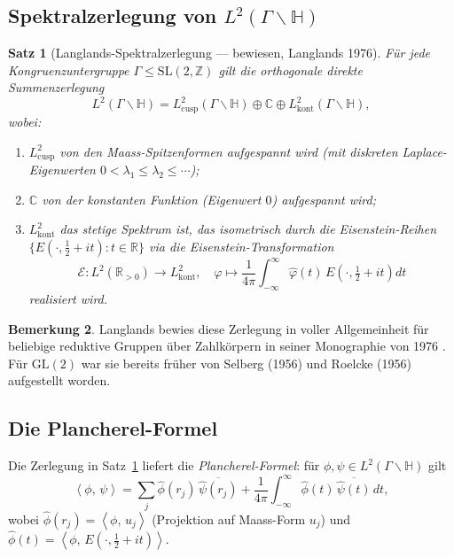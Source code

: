 \documentclass[12pt,a4paper]{amsart}
\newtheorem{theorem}{Satz}[section]
\theoremstyle{definition}
\newtheorem{bemerkung}[theorem]{Bemerkung}
\newcommand{\HH}{\mathbb{H}}
\newcommand{\ZZ}{\mathbb{Z}}
\newcommand{\RR}{\mathbb{R}}
\newcommand{\CC}{\mathbb{C}}
\newcommand{\GL}{\mathrm{GL}}
\newcommand{\SL}{\mathrm{SL}}
\newcommand{\inner}[2]{\left\langle #1,\, #2 \right\rangle}
\begin{document}
\subsection{Spektralzerlegung von \texorpdfstring{$L^2(\Gamma \backslash \HH)$}{L2}}

\begin{theorem}[Langlands-Spektralzerlegung — bewiesen, Langlands 1976]
\label{satz:langlands_zerlegung}
Für jede Kongruenzuntergruppe $\Gamma \leq \SL(2,\ZZ)$ gilt die orthogonale
direkte Summenzerlegung
\[
L^2(\Gamma \backslash \HH) = L^2_{\mathrm{cusp}}(\Gamma \backslash \HH) \oplus \CC \oplus L^2_{\mathrm{kont}}(\Gamma \backslash \HH),
\]
wobei:
\begin{enumerate}[label=(\roman*)]
\item $L^2_{\mathrm{cusp}}$ von den \emph{Maass-Spitzenformen} aufgespannt wird
  (mit diskreten Laplace-Eigenwerten $0 < \lambda_1 \leq \lambda_2 \leq \cdots$);
\item $\CC$ von der konstanten Funktion (Eigenwert $0$) aufgespannt wird;
\item $L^2_{\mathrm{kont}}$ das stetige Spektrum ist, das isometrisch durch die
  Eisenstein-Reihen $\bigl\{E(\cdot,\tfrac{1}{2}+it) : t \in \RR\bigr\}$ via
  die Eisenstein-Transformation
  \[
  \mathcal{E}: L^2(\RR_{>0}) \to L^2_{\mathrm{kont}},\quad
  \varphi \mapsto \frac{1}{4\pi}\int_{-\infty}^\infty \hat\varphi(t)\, E\!\left(\cdot, \tfrac{1}{2}+it\right) dt
  \]
  realisiert wird.
\end{enumerate}
\end{theorem}

\begin{bemerkung}
Langlands bewies diese Zerlegung in voller Allgemeinheit für beliebige reduktive
Gruppen über Zahlkörpern in seiner Monographie von 1976 \cite{langlands1976}.
Für $\GL(2)$ war sie bereits früher von Selberg (1956) und Roelcke (1956) aufgestellt
worden.
\end{bemerkung}

\subsection{Die Plancherel-Formel}

Die Zerlegung in Satz~\ref{satz:langlands_zerlegung} liefert die \emph{Plancherel-Formel}:
für $\phi, \psi \in L^2(\Gamma \backslash \HH)$ gilt
\[
\inner{\phi}{\psi} = \sum_j \hat\phi(r_j)\, \overline{\hat\psi(r_j)}
+ \frac{1}{4\pi} \int_{-\infty}^\infty \hat\phi(t)\, \overline{\hat\psi(t)}\, dt,
\]
wobei $\hat\phi(r_j) = \inner{\phi}{u_j}$ (Projektion auf Maass-Form $u_j$) und
$\hat\phi(t) = \inner{\phi}{E(\cdot, \frac{1}{2}+it)}$.
\end{document}
